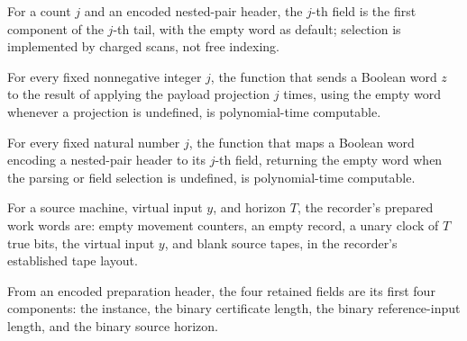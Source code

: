 \begin{definition}
\label{Complexity.clHeaderField}
\leanok
{}
For a count $j$ and an encoded nested-pair header, the $j$-th field is the first component of the $j$-th tail, with the empty word as default; selection is implemented by charged scans, not free indexing.
\end{definition}

\begin{lemma}
\label{Complexity.clHeaderTail_native}
\leanok
{}
For every fixed nonnegative integer $j$, the function that sends a Boolean word $z$ to
the result of applying the payload projection $j$ times, using the empty word whenever a
projection is undefined, is polynomial-time computable.
\end{lemma}

\begin{lemma}
\label{Complexity.clHeaderField_native}
\leanok
{}
For every fixed natural number $j$, the function that maps a Boolean word encoding a
nested-pair header to its $j$-th field, returning the empty word when the parsing or
field selection is undefined, is polynomial-time computable.
\end{lemma}

\begin{definition}
\label{Complexity.clRecWords}
\leanok
{}
For a source machine, virtual input $y$, and horizon $T$, the recorder's prepared work words are: empty movement counters, an empty record, a unary clock of $T$ true bits, the virtual input $y$, and blank source tapes, in the recorder's established tape layout.
\end{definition}

\begin{definition}
\label{Complexity.clHeaderKeep}
\leanok
{}
From an encoded preparation header, the four retained fields are its first four components: the instance, the binary certificate length, the binary reference-input length, and the binary source horizon.
\end{definition}


